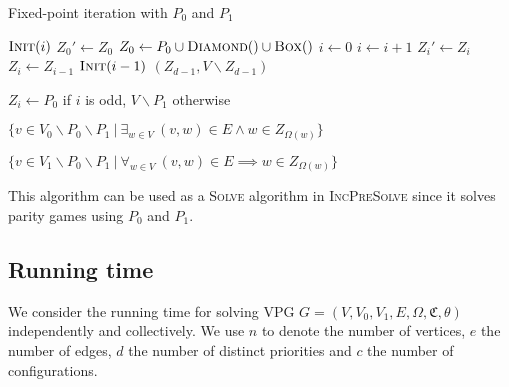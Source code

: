 \begin{algorithm}
	\caption{Fixed-point iteration with $P_0$ and $P_1$}
	\label{alg_FPITE}
	\begin{multicols}{2}
		\begin{algorithmic}[1]
					\State $\textsc{Init}(i)$
				\EndFor
				\Repeat
					\State $Z_0'\gets Z_0$
					\State $Z_0 \gets P_0 \cup \textsc{Diamond}() \cup \textsc{Box}()$
					\State $i \gets 0$
						\State $i \gets i+1$
						\State $Z_i' \gets Z_i$
						\State $Z_i \gets Z_{i-1}$
						\State $\textsc{Init}(i-1)$
					\EndWhile
				\State \Return $(Z_{d-1},V\backslash Z_{d-1})$
			\EndFunction
		\end{algorithmic}\bigskip\bigskip\bigskip
		\begin{algorithmic}[1]
			\Function{Init}{$i$}
				\State $Z_i \gets P_0$ if $i$ is odd, $V\backslash P_1$ otherwise
			\EndFunction
		\end{algorithmic}\bigskip
		\begin{algorithmic}[1]
			\Function{Diamond}{}
				\State \Return $\{ v \in V_0 \backslash P_0 \backslash P_1 \ |\ \exists_{w\in V}\ (v,w) \in E \wedge w \in Z_{\Omega(w)}\}$
			\EndFunction
		\end{algorithmic}\bigskip
		\begin{algorithmic}[1]
			\Function{Box}{}
			\State \Return $\{ v \in V_1\backslash P_0 \backslash P_1\ |\ \forall_{w\in V}\ (v,w) \in E \implies w \in Z_{\Omega(w)}\}$
			\EndFunction
		\end{algorithmic}
	\end{multicols}
\end{algorithm}

This algorithm can be used as a \textsc{Solve} algorithm in \textsc{IncPreSolve} since it solves parity games using $P_0$ and $P_1$.

\subsection{Running time}
We consider the running time for solving VPG $G = (V,V_0,V_1,E,\Omega,\mathfrak{C},\theta)$ independently and collectively. We use $n$ to denote the number of vertices, $e$ the number of edges, $d$ the number of distinct priorities and $c$ the number of configurations.

